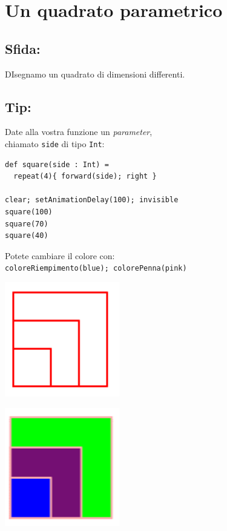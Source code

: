 \chapter{Un quadrato parametrico}
\begin{multicols}{2}
\section*{\color{BrickRed}Sfida:}
DIsegnamo un quadrato di dimensioni differenti.
\section*{\color{OliveGreen}Tip:}
Date alla vostra funzione un {\it parameter},\\
chiamato \lstinline{side} di tipo \lstinline{Int}:

\begin{lstlisting}[basicstyle={\ttfamily\fontsize{16}{19}\selectfont},numbers=none]
def square(side : Int) = 
  repeat(4){ forward(side); right }

clear; setAnimationDelay(100); invisible
square(100) 
square(70)
square(40)
\end{lstlisting}
        
Potete cambiare il colore con:\\
\lstinline{coloreRiempimento(blue); colorePenna(pink)}


\columnbreak


\begin{center}
\includegraphics[width=5.0cm]{../img/square-param.png}
\end{center}

\begin{center}
\includegraphics[width=5.0cm]{../img/square-param-color.png}
\end{center}

\end{multicols}

